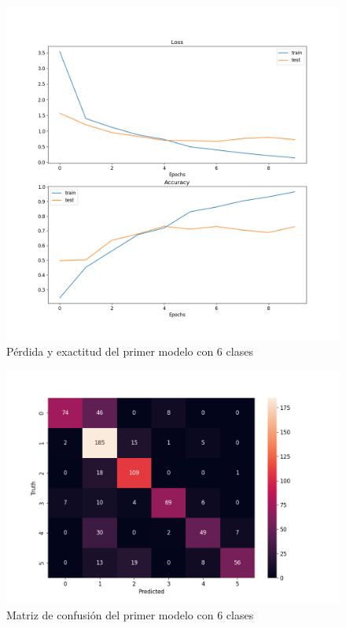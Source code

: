 \begin{figure}[H]
	\centering
	\includegraphics[scale=0.65]{figures/LA2.png}
	\caption{Pérdida y exactitud del primer modelo con 6 clases}
	\label{fig:img13}
\end{figure}

\begin{figure}[H]
	\centering
	\includegraphics[scale=0.75]{figures/CM2.png}
	\caption{Matriz de confusión del primer modelo con 6 clases}
	\label{fig:img14}
\end{figure}

